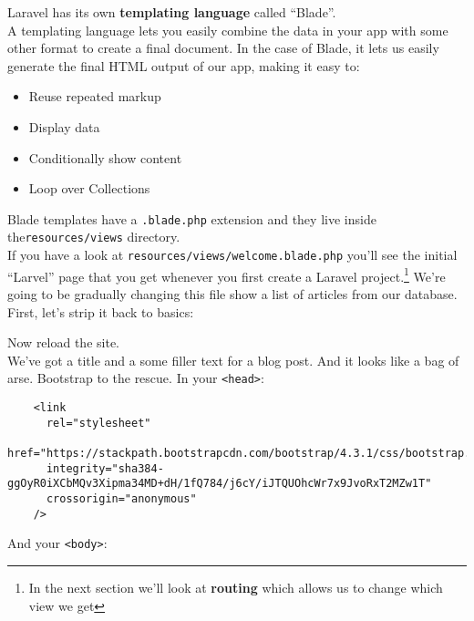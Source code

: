 Laravel has its own \textbf{templating language} called ``Blade''.
\\

A templating language lets you easily combine the data in your app with some other format to create a final document. In the case of Blade, it lets us easily generate the final HTML output of our app, making it easy to:
\\

\begin{itemize}
    \item Reuse repeated markup
    \item Display data
    \item Conditionally show content
    \item Loop over Collections
\end{itemize}

Blade templates have a \texttt{.blade.php} extension and they live inside the\texttt{resources/views} directory.
\\

If you have a look at \texttt{resources/views/welcome.blade.php} you'll see the initial ``Larvel'' page that you get whenever you first create a Laravel project.\footnote{In the next section we'll look at \textbf{routing} which allows us to change which view we get} We're going to be gradually changing this file show a list of articles from our database.
\\

First, let's strip it back to basics:


Now reload the site.
\\

We've got a title and a some filler text for a blog post. And it looks like a bag of arse. Bootstrap to the rescue. In your \texttt{<head>}:

\begin{verbatim}
    <link
      rel="stylesheet"
      href="https://stackpath.bootstrapcdn.com/bootstrap/4.3.1/css/bootstrap.min.css"
      integrity="sha384-ggOyR0iXCbMQv3Xipma34MD+dH/1fQ784/j6cY/iJTQUOhcWr7x9JvoRxT2MZw1T"
      crossorigin="anonymous"
    />
\end{verbatim}

And your \texttt{<body>}:


